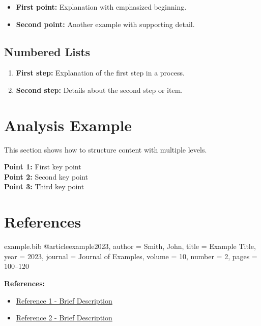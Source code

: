 \documentclass[a4paper,11pt,xetex]{article}
\begin{document}
\begin{itemize}
    \item \textbf{First point:} Explanation with emphasized beginning.
    
    \item \textbf{Second point:} Another example with supporting detail.
\end{itemize}

\subsection{Numbered Lists}

\begin{enumerate}
    \item \textbf{First step:} Explanation of the first step in a process.
    
    \item \textbf{Second step:} Details about the second step or item.
\end{enumerate}

\section{Analysis Example}

This section shows how to structure content with multiple levels.

\begin{infobox}[title=Key Points]
\textbf{Point 1:} First key point\\
\textbf{Point 2:} Second key point\\
\textbf{Point 3:} Third key point
\end{infobox}

\section{References}

\begin{filecontents*}{example.bib}
@article{example2023,
  author = {Smith, John},
  title = {Example Title},
  year = {2023},
  journal = {Journal of Examples},
  volume = {10},
  number = {2},
  pages = {100--120}
}
\end{filecontents*}

\textbf{References:}
\begin{itemize}
    \item \href{https://example.com/source1}{Reference 1 - Brief Description}
    \item \href{https://example.com/source2}{Reference 2 - Brief Description}
\end{itemize}


\label{LastPage}
\end{document}
